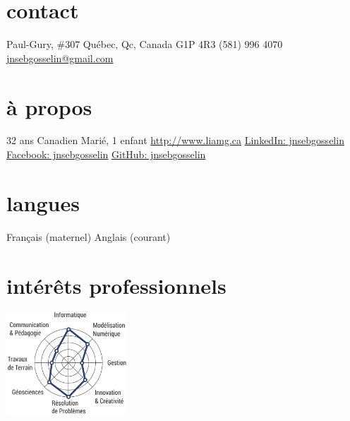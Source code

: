\documentclass[print]{friggos-cv} %
\begin{document}


\begin{aside} %
	\section{contact}%
	    \vspace{5pt}
		\home{} Paul-Gury, \#307
		\hspace{0.43cm}Québec, Qc, Canada
		\hspace{0.43cm}G1P 4R3\vspace{5pt}
		\phoneb \space (581) 996 4070
		\href{mailto:jnsebgosselin@gmail.com}{\mail\space jnsebgosselin@gmail.com}
		\vspace{10pt}%
	\section{à propos}%
		\vspace{5pt}
		32 ans
		Canadien
		Marié, 1 enfant%
		\vspace{5pt}
		\href{http://www.liamg.ca/qui-sommes-nous/jean-sebastien-gosselin/}{\globe\hspace{0.1cm} http://www.liamg.ca}
		\href{https://www.linkedin.com/in/jnsebgosselin}{\linkedin\hspace{0.1cm} LinkedIn: jnsebgosselin}
		\href{https://www.facebook.com/jnsebgosselin}{\facebook\hspace{0.1cm} Facebook: jnsebgosselin}
		\href{https://github.com/jnsebgosselin}{\github\hspace{0.1cm} GitHub: jnsebgosselin}
		\vspace{10pt}%
	\section{langues}%
		\vspace{5pt}
		Français (maternel)
		Anglais (courant)
		\vspace{10pt}%
	\section{intérêts professionnels}%
		\vspace{10pt}
		\includegraphics[width=4.5cm]{prof_interests_graph}
		\vspace{5pt}%

\end{aside}
\end{document}
